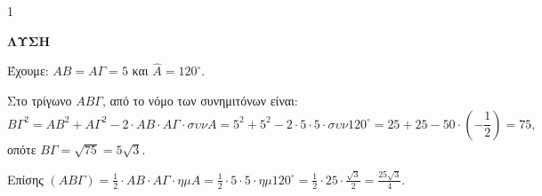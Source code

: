 \begin{ylh}{1}
    \item [Ύλη από εικόνα]
\end{ylh}
\textbf{ΛΥΣΗ}

Έχουμε: $AB = A\Gamma = 5$ και $\hat{A} = 120^\circ$.

\begin{alist}
    \item Στο τρίγωνο $AB\Gamma$, από το νόμο των συνημιτόνων είναι:
    \[
    B\Gamma^2 = AB^2 + A\Gamma^2 - 2 \cdot AB \cdot A\Gamma \cdot \sigma\upsilon\nu A = 5^2 + 5^2 - 2 \cdot 5 \cdot 5 \cdot \sigma\upsilon\nu 120^\circ = 25 + 25 - 50 \cdot \left(-\frac{1}{2}\right) = 75,
    \]
    οπότε $B\Gamma = \sqrt{75} = 5\sqrt{3}$. 
    \item Επίσης $(AB\Gamma) = \frac{1}{2} \cdot AB \cdot A\Gamma \cdot \eta\mu A = \frac{1}{2} \cdot 5 \cdot 5 \cdot \eta\mu 120^\circ = \frac{1}{2} \cdot 25 \cdot \frac{\sqrt{3}}{2} = \frac{25\sqrt{3}}{4}$. 
\end{alist}